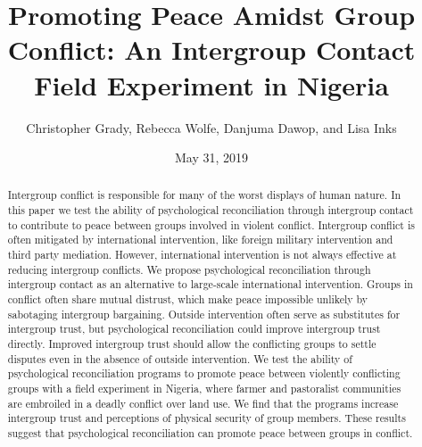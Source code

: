 \documentclass[11pt]{article}
\title{Promoting Peace Amidst Group Conflict: An Intergroup Contact Field
Experiment in Nigeria}
\author{
Christopher Grady, Rebecca Wolfe, Danjuma Dawop, and Lisa Inks
}
\date{May 31, 2019}
\begin{document}
\VerbatimFootnotes

%
%
%
%
%
%
%
%
%
%

\maketitle

\begin{abstract}

Intergroup conflict is responsible for many of the worst displays of human nature.  In this paper we test the ability of psychological reconciliation through intergroup contact to contribute to peace between groups involved in violent conflict.  Intergroup conflict is often mitigated by international intervention, like foreign military intervention and third party mediation.  However, international intervention is not always effective at reducing intergroup conflicts.  We propose psychological reconciliation through intergroup contact as an alternative to large-scale international intervention.  Groups in conflict often share mutual distrust, which make peace impossible unlikely by sabotaging intergroup bargaining.  Outside intervention often serve as substitutes for intergroup trust, but psychological reconciliation could improve intergroup trust directly.  Improved intergroup trust should allow the conflicting groups to settle disputes even in the absence of outside intervention.  We test the ability of psychological reconciliation programs to promote peace between violently conflicting groups with a field experiment in Nigeria, where farmer and pastoralist communities are embroiled in a deadly conflict over land use.  We find that the programs increase intergroup trust and perceptions of physical security of group members.  These results suggest that psychological reconciliation can promote peace between groups in conflict.

\end{abstract}
\end{document}
